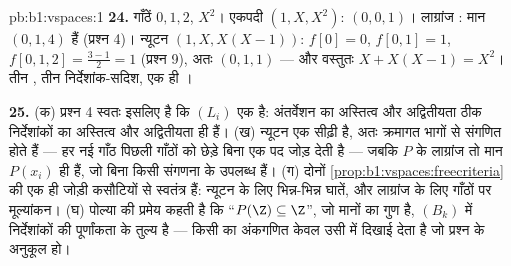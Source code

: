 \begin{solution}{pb:b1:vspaces:1}
\textbf{24.} गाँठें $0, 1, 2$,  $X^2$। एकपदी  $(1, X, X^2)$:
 $(0, 0, 1)$। लाग्रांज :  मान $(0, 1, 4)$ हैं
(प्रश्न 4)। न्यूटन  $(1, X, X(X-1))$:  $f[0] = 0$, $f[0,1] =
1$, $f[0,1,2] = \frac{3 - 1}{2} = 1$ (प्रश्न 9), अतः  $(0, 1, 1)$
--- और वस्तुतः $X + X(X-1) = X^2$। तीन , तीन निर्देशांक-सदिश, एक ही
।

\textbf{25.} (क) प्रश्न 4 स्वतः इसलिए है कि $(L_i)$ एक \emph{} है:
अंतर्वेशन का अस्तित्व और अद्वितीयता ठीक निर्देशांकों का अस्तित्व और
अद्वितीयता ही हैं। (ख) न्यूटन  एक सीढ़ी है, अतः  क्रमागत भागों
से संगणित होते हैं --- हर नई गाँठ पिछली गाँठों को छेड़े बिना एक पद जोड़ देती
है --- जबकि $P$ के लाग्रांज  तो मान $P(x_i)$ ही हैं, जो बिना किसी
संगणना के उपलब्ध हैं। (ग) दोनों  \cref{prop:b1:vspaces:freecriteria} की
एक ही जोड़ी कसौटियों से स्वतंत्र हैं: न्यूटन के लिए भिन्न-भिन्न घातें, और
लाग्रांज के लिए गाँठों पर मूल्यांकन। (घ) पोल्या की प्रमेय कहती है कि
``$P(\Z) \subseteq \Z$'', जो मानों का गुण है,  $(B_k)$ में निर्देशांकों
की पूर्णांकता के तुल्य है --- किसी  का अंकगणित केवल उसी  में दिखाई
देता है जो प्रश्न के अनुकूल हो।
\end{solution}

